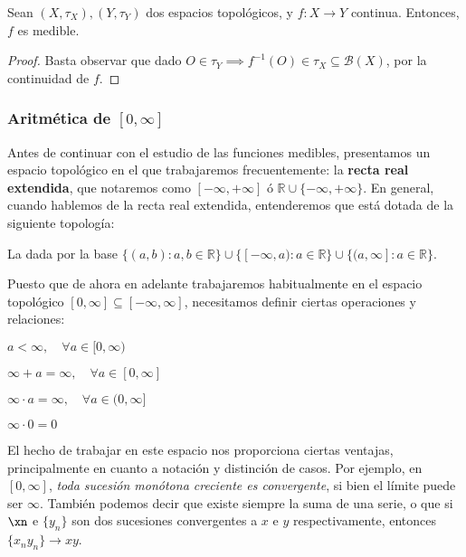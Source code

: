 \begin{nprop} Sean $(X,\tau_X), (Y, \tau_Y)$ dos espacios topológicos, y $f:X\longrightarrow Y$ continua. Entonces, $f$ es medible.
\end{nprop}

\begin{proof} Basta observar que dado $O \in \tau_Y \implies f^{-1}(O) \in \tau_X \subseteq \mathcal B(X)$, por la continuidad de $f$.
\end{proof}


\subsubsection{Aritmética de $[0,\infty]$}

Antes de continuar con el estudio de las funciones medibles, presentamos un espacio topológico en el que trabajaremos frecuentemente: la \textbf{recta real extendida}, que notaremos como $[-\infty,+\infty]$ ó $\mathbb{R} \cup \{-\infty, +\infty\}$. En general, cuando hablemos de la recta real extendida, entenderemos que está dotada de la siguiente topología: 

\begin{ndef} \label{topologia_real_ext}
	La dada por la base $\{(a,b): a,b \in \mathbb{R}\} \cup \{[-\infty, a): a \in \mathbb{R}\} \cup \{(a,\infty]: a \in \mathbb{R}\}$.

\end{ndef}

Puesto que de ahora en adelante trabajaremos habitualmente en el espacio topológico $[0,\infty] \subseteq [-\infty,\infty]$, necesitamos definir ciertas operaciones y relaciones:
\begin{nlist}
\item $a < \infty, \quad \forall a \in [0,\infty)$
\item $\infty + a = \infty, \quad \forall a \in [0,\infty]$
\item $\infty \cdot a = \infty, \quad \forall a \in (0,\infty]$
\item $\infty \cdot 0 = 0$
\end{nlist}

El hecho de trabajar en este espacio nos proporciona ciertas ventajas, principalmente en cuanto a notación y distinción de casos. Por ejemplo, en $[0, \infty]$, \textit{toda sucesión monótona creciente es convergente}, si bien el límite puede ser $\infty$. También podemos decir que existe siempre la suma de una serie, o que si $\xn$ e $\{y_n\}$ son dos sucesiones convergentes a $x$ e $y$ respectivamente, entonces $\{x_ny_n\} \to xy$.


